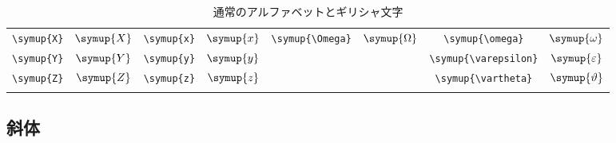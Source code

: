\begin{longtable}{cccccccc}
    \verb|\symup{X}| & \(\symup{X}\) & \verb|\symup{x}| & \(\symup{x}\) & \verb|\symup{\Omega}|   & \(\symup{\Omega}\)   & \verb|\symup{\omega}|      & \(\symup{\omega}\)      \\
    \verb|\symup{Y}| & \(\symup{Y}\) & \verb|\symup{y}| & \(\symup{y}\) &                         &                      & \verb|\symup{\varepsilon}| & \(\symup{\varepsilon}\) \\
    \verb|\symup{Z}| & \(\symup{Z}\) & \verb|\symup{z}| & \(\symup{z}\) &                         &                      & \verb|\symup{\vartheta}|   & \(\symup{\vartheta}\)   \\
    \bottomrule
    \caption{通常のアルファベットとギリシャ文字}
    \label{tab:upright_letters}
\end{longtable}

\subsection{斜体}

